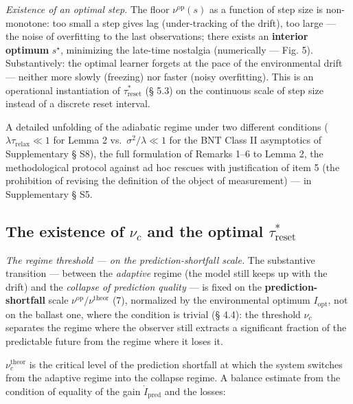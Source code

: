 \documentclass[pdflatex,sn-mathphys-ay]{sn-jnl}
\begin{document}
\emph{Existence of an optimal step.} The floor \(\nu^{\text{op}}(s)\) as a function of step size is non-monotone: too small a step gives lag (under-tracking of the drift), too large --- the noise of overfitting to the last observations; there exists an \textbf{interior optimum} \(s^\star\), minimizing the late-time nostalgia (numerically --- Fig. 5). Substantively: the optimal learner forgets at the pace of the environmental drift --- neither more slowly (freezing) nor faster (noisy overfitting). This is an operational instantiation of \(\tau_{\text{reset}}^*\) (§ 5.3) on the continuous scale of step size instead of a discrete reset interval.



A detailed unfolding of the adiabatic regime under two different conditions (\(\lambda \tau_{\text{relax}} \ll 1\) for Lemma 2 vs.~\(\sigma^2/\lambda \ll 1\) for the BNT Class II asymptotics of Supplementary § S8), the full formulation of Remarks 1--6 to Lemma 2, the methodological protocol against ad hoc rescues with justification of item 5 (the prohibition of revising the definition of the object of measurement) --- in Supplementary § S5.



\subsection{\texorpdfstring{The existence of \(\nu_c\) and the optimal \(\tau_{\text{reset}}^*\)}{The existence of \textbackslash nu\_c and the optimal \textbackslash tau\_\{\textbackslash text\{reset\}\}\^{}*}}\label{the-existence-of-nu_c-and-the-optimal-tau_textreset}



\emph{The regime threshold --- on the prediction-shortfall scale.} The substantive transition --- between the \emph{adaptive} regime (the model still keeps up with the drift) and the \emph{collapse of prediction quality} --- is fixed on the \textbf{prediction-shortfall} scale \(\nu^{\text{op}}/\nu^{\text{theor}}\) (7), normalized by the environmental optimum \(I_{\text{opt}}\), not on the ballast one, where the condition is trivial (§ 4.4): the threshold \(\nu_c\) separates the regime where the observer still extracts a significant fraction of the predictable future from the regime where it loses it.



\(\nu_c^{\text{theor}}\) is the critical level of the prediction shortfall at which the system switches from the adaptive regime into the collapse regime. A balance estimate from the condition of equality of the gain \(\dot{I}_{\text{pred}}\) and the losses:
\end{document}
